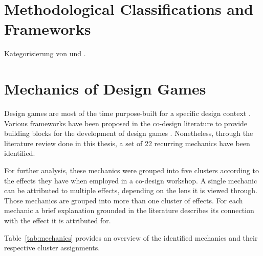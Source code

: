 \documentclass[draft,twoside]{vutinfth}
\begin{document}
        \section{Methodological Classifications and Frameworks}
        Kategorisierung von \cite{brandtDesigningExploratoryDesign2006} und \cite{vaajakallioDesignGamesCodesign2014}.

        \section{Mechanics of Design Games}
    Design games are most of the time purpose-built for a specific design context \cite{brandtDesigningExploratoryDesign2006}. 
    Various frameworks have been proposed in the co-design literature to provide building blocks for the development 
    of design games \cite{brandtDesigningExploratoryDesign2006,vaajakallioDesignGamesCodesign2014}. 
    Nonetheless, through the literature review done in this thesis, a set of 22 recurring mechanics have been identified.  

    For further analysis, these mechanics were grouped into five clusters according to the effects they have 
    when employed in a co-design workshop. A single mechanic can be attributed to multiple effects, depending on 
    the lens it is viewed through. Those mechanics are grouped into more than one cluster of effects. For each mechanic 
    a brief explanation grounded in the literature describes its connection with the effect it is attributed for. 

    Table~\ref{tab:mechanics} provides an overview of the identified mechanics and their respective cluster assignments. 
\end{document}
